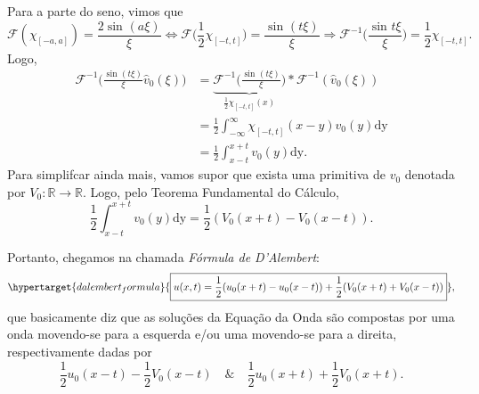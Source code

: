\documentclass[../pde_notes.tex]{subfiles}
\begin{document}
Para a parte do seno, vimos que
\[
	\mathcal{F}(\chi_{[-a, a]}) = \frac{2\sin^{}{(a\xi )}}{\xi } \Longleftrightarrow \mathcal{F}\biggl(\frac{1}{2}\chi_{[-t, t]}\biggr) = \frac{\sin^{}{(t\xi )}}{\xi } \Rightarrow \mathcal{F}^{-1}\biggl(\frac{\sin^{}{t\xi }}{\xi }\biggr) = \frac{1}{2}\chi_{[-t, t]}.
\]
Logo,
\begin{align*}
	\mathcal{F}^{-1}\biggl(\frac{\sin^{}{(t\xi )}}{\xi }\hat{v}_{0}(\xi )\biggr) & = \underbrace{\mathcal{F}^{-1}\biggl(\frac{\sin^{}{(t\xi )}}{\xi }\biggr)}_{\frac{1}{2}\chi_{[-t, t]}(x)}*\mathcal{F}^{-1}(\hat{v}_{0}(\xi )) \\
	                                                                             & = \frac{1}{2}\int_{-\infty}^{\infty}\chi_{[-t, t]}(x-y)v_{0}(y) \mathrm{dy}                                                                   \\
	                                                                             & = \frac{1}{2}\int_{x-t}^{x+t}v_{0}(y) \mathrm{dy}.
\end{align*}
Para simplifcar ainda mais, vamos supor que exista uma primitiva de \(v_{0}\) denotada por \(V_{0}:\mathbb{R}\rightarrow \mathbb{R}\). Logo, pelo Teorema Fundamental do Cálculo,
\[
	\frac{1}{2}\int_{x-t}^{x+t}v_{0}(y) \mathrm{dy} = \frac{1}{2}(V_{0}(x+t) - V_{0}(x-t)).
\]

Portanto, chegamos na chamada \textit{Fórmula de D'Alembert}:
\[
	\hypertarget{dalembert_formula}{\boxed{u(x, t) = \frac{1}{2}(u_{0}(x+t) - u_{0}(x-t)) + \frac{1}{2}(V_{0}(x+t)+V_{0}(x-t))}},
\]
que basicamente diz que as soluções da Equação da Onda são compostas por uma onda movendo-se para a esquerda e/ou uma movendo-se para a direita, respectivamente dadas por
\[
	\frac{1}{2}u_{0}(x-t) - \frac{1}{2}V_{0}(x-t) \quad\&\quad \frac{1}{2}u_{0}(x+t) + \frac{1}{2}V_{0}(x+t).
\]
\end{document}
